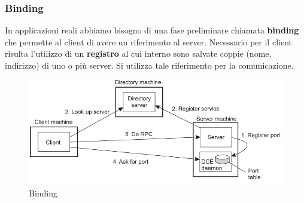 \documentclass[12pt]{article}
\begin{document}
		\subsubsection{Binding}
			In applicazioni reali abbiamo bisogno di una fase preliminare chiamata \textbf{binding} che permette al client di avere un riferimento al server. Necessario per il client risulta l'utilizzo di un \textbf{registro} al cui interno sono salvate coppie (nome, indirizzo) di uno o più server. Si utilizza tale riferimento per la comunicazione.
			\begin{figure}[h!]
				\centering
				\includegraphics[scale=0.45]{img/bind.png}
				\caption{Binding }
			\end{figure}
		
\end{document}
